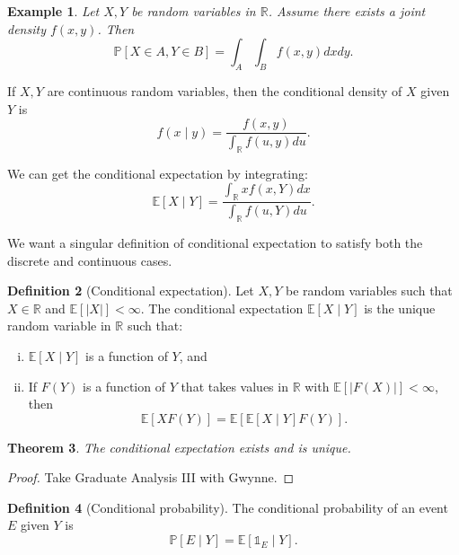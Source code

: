 \documentclass{tufte-handout}
\newcommand*\R{\mathbb{R}}
\newcommand*\E{\mathbb{E}}
\renewcommand*\P{\mathbb{P}}
\newtheorem{thm}{Theorem}[subsection]
\newtheorem{ex}[thm]{Example}
\theoremstyle{definition}
\newtheorem{defn}[thm]{Definition}
\begin{document}
\begin{ex}
	Let $X,Y$ be random variables in $\R$. Assume there exists a joint density $f(x,y)$. Then \[
		\P\left[X \in A, Y \in B\right] = \int_{A}^{} \int_{B}^{} f(x,y) dxdy  
	.\] 
\end{ex}

If $X,Y$ are continuous random variables, then the conditional density of $X$ given $Y$ is \[
	f(x \mid y) = \frac{f(x,y)}{\int_{\R}^{} f(u,y)du }
.\] 

We can get the conditional expectation by integrating: \[
	\E\left[X \mid Y\right] = \frac{\int_{\R}^{} xf(x,Y)dx }{\int_{\R}^{} f(u,Y)du }
.\] 

We want a singular definition of conditional expectation to satisfy both the discrete and continuous cases.

\begin{defn}[Conditional expectation]
	Let $X,Y$ be random variables such that $X \in \R$ and $\E\left[\left| X \right|\right] < \infty$. The conditional expectation $\E\left[X \mid Y\right] $ is the unique random variable in $\R$ such that:
	\begin{enumerate}[(i)]
		\item $\E\left[X \mid Y\right] $ is a function of $Y$, and 
		\item If $F(Y)$ is a function of $Y$ that takes values in $\R$ with $\E\left[\left| F(X) \right|\right] < \infty$, then \[
			\E\left[X F(Y)\right] = \E\left[\E\left[X\mid Y\right] F(Y)\right] 
		.\] 
	\end{enumerate}
\end{defn}

\begin{thm}
	The conditional expectation exists and is unique.
\end{thm}
\begin{proof}
	Take Graduate Analysis III with Gwynne.
\end{proof}

\begin{defn}[Conditional probability]
	The conditional probability of an event $E$ given $Y$ is \[
		\P\left[E \mid Y\right] = \E\left[\mathds{1}_E \mid Y\right] 
	.\] 
\end{defn}
\end{document}
